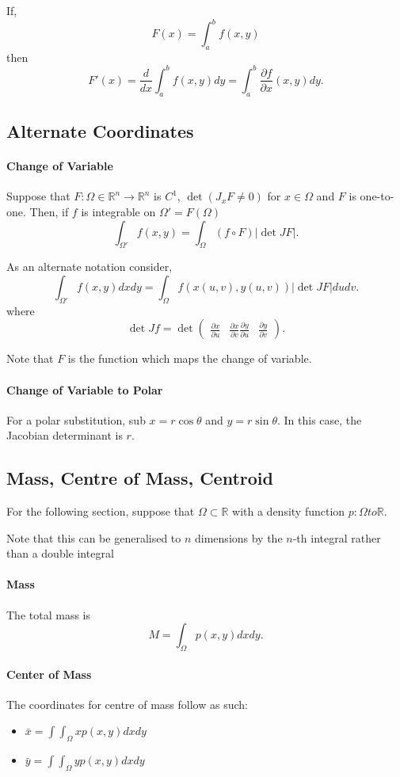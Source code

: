If,
\[F(x) = \int_a^b f(x, y)\]
then
\[F'(x) = \frac{d}{dx} \int_a^b f(x, y)dy = \int_a^b \frac{\partial f}{\partial x}(x,y) dy.\]

\subsection{Alternate Coordinates}
\paragraph{Change of Variable}
Suppose that \(F: \Omega\in\mathbb{R}^n \to \mathbb{R}^n\) is \(C^1\),
\(\det(J_xF \neq 0)\) for \(x\in\Omega\) and \(F\) is one-to-one.
Then, if \(f\) is integrable on \(\Omega ' = F(\Omega)\)
\[
    \int_{\Omega '} f(x, y)
    =
    \int_{\Omega} (f\circ F) |\det J F|.
\]

As an alternate notation consider,
\[
    \int_{\Omega '} f(x, y)dx dy
    =
    \int_\Omega f( x(u, v), y(u, v) ) |\det JF| du dv.
\]
where
\[
    \det Jf = \det \begin{pmatrix}
        \frac{\partial x}{\partial u} & \frac{\partial x}{\partial v}
        \frac{\partial y}{\partial u} & \frac{\partial y}{\partial v}
    \end{pmatrix}.
\]

Note that \(F\) is the function which maps the change of variable.

\paragraph{Change of Variable to Polar}
For a polar substitution, sub \(x = r\cos \theta\) and \(y = r\sin\theta\).
In this case, the Jacobian determinant is \(r\).

\subsection{Mass, Centre of Mass, Centroid}
For the following section, suppose that \(\Omega\subset \mathbb{R}\)
with a density function \(p: \Omega to \mathbb{R}\).

Note that this can be generalised to \(n\) dimensions by the \(n\)-th integral
rather than a double integral

\paragraph{Mass}
The total mass is
\[M = \int_\Omega p(x, y) dx dy.\]

\paragraph{Center of Mass}
The coordinates for centre of mass follow as such:
\begin{itemize}
    \item \(\bar{x} = \int\int_\Omega x p(x, y) dx dy\)
    \item \(\bar{y} = \int\int_\Omega y p(x, y) dx dy\)
\end{itemize}



